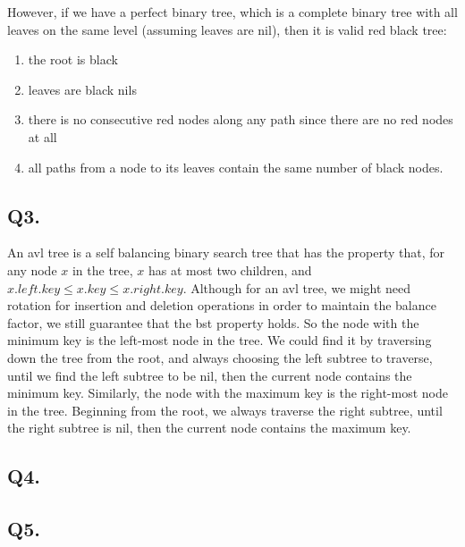 \documentclass[12pt]{article}
\begin{document}
\noindent However, if we have a perfect binary tree, which is a complete binary tree with all leaves on the same level (assuming leaves are nil), then it is valid red black tree:
     \begin{enumerate}
          \setlength \itemsep{0em} 
          \item the root is black
          \item leaves are black nils
          \item there is no consecutive red nodes along any path since there are no red nodes at all
          \item all paths from a node to its leaves contain the same number of black nodes.
     \end{enumerate}

\subsection*{Q3.}
An avl tree is a self balancing binary search tree that has the property that, for any node \(x\) in the tree, \(x\) has at most two children, and \(x.left.key \leq x.key \leq x.right.key\). Although for an avl tree, we might need rotation for insertion and deletion operations in order to maintain the balance factor, we still guarantee that the bst property holds. So the node with the minimum key is the left-most node in the tree. We could find it by traversing down the tree from the root, and always choosing the left subtree to traverse, until we find the left subtree to be nil, then the current node contains the minimum key. Similarly, the node with the maximum key is the right-most node in the tree. Beginning from the root, we always traverse the right subtree, until the right subtree is nil, then the current node contains the maximum key. 

\subsection*{Q4.}

\subsection*{Q5.}
\end{document}
